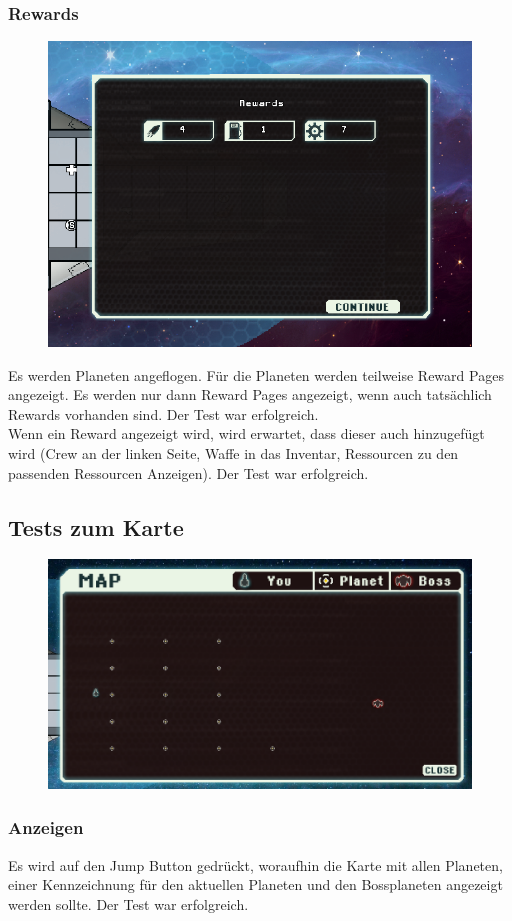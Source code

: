 \documentclass[fontsize=12pt,paper=a4,twoside]{scrartcl}
\begin{document}
\subsubsection{Rewards}
\begin{figure}[h!]
\centering
\includegraphics[width=0.5\linewidth]{images/rewards.png}
\end{figure}
Es werden Planeten angeflogen. Für die Planeten werden teilweise Reward Pages angezeigt. Es werden nur dann Reward Pages angezeigt, wenn auch tatsächlich Rewards vorhanden sind. Der Test war erfolgreich. \\
Wenn ein Reward angezeigt wird, wird erwartet, dass dieser auch hinzugefügt wird (Crew an der linken Seite, Waffe in das Inventar, Ressourcen zu den passenden Ressourcen Anzeigen). Der Test war erfolgreich. \\



\subsection{Tests zum Karte}
\begin{figure}[h!]
\centering
\includegraphics[width=0.5\linewidth]{images/map.png}
\end{figure}
\subsubsection{Anzeigen}
Es wird auf den Jump Button gedrückt, woraufhin die Karte mit allen Planeten, einer Kennzeichnung für den aktuellen Planeten und den Bossplaneten angezeigt werden sollte.  Der Test war erfolgreich. \\
\end{document}
